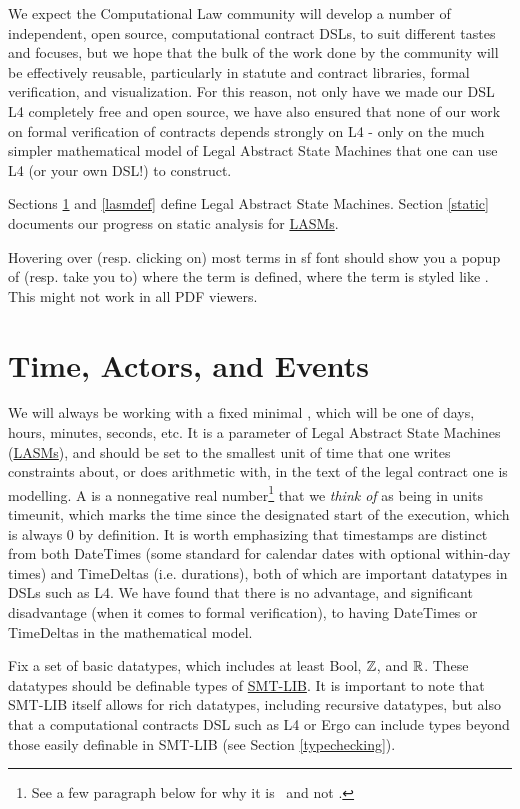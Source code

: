 \documentclass[12pt]{article}
\newcommand{\term}[1]{\EM{\textsf{\hyperref[#1]{#1}}}\xspace}
\newcommand{\lasm}{\term{LASM}}
\newcommand{\lasms}{{\sf \hyperref[LASM]{LASMs}}\xspace}
\newcommand{\DT}{\EM{\mathbb{\hyperref[DT]{D}}}}
\newcommand{\TS}{\EM{\mathbb{\hyperref[TS]{T}}}}
\begin{document}
We expect the Computational Law community will develop a number of independent, open source, computational contract DSLs, to suit different tastes and focuses, but we hope that the bulk of the work done by the community will be effectively reusable, particularly in statute and contract libraries, formal verification, and visualization. For this reason, not only have we made our DSL L4 completely free and open source, we have also ensured that none of our work on formal verification of contracts depends strongly on L4 - only on the much simpler mathematical model of Legal Abstract State Machines that one can use L4 (or your own DSL!) to construct.

Sections \ref{basics} and \ref{lasmdef} define Legal Abstract State Machines. Section \ref{static} documents our progress on static analysis for \lasms.

Hovering over (resp. clicking on) most terms in \textsf{{sf font}} should show you a popup of (resp. take you to)  where the term is defined, where the term is styled like . This might not work in all PDF viewers.


\section{Time, Actors, and Events} \label{basics}
We will always be working with a fixed minimal , which will be one of days, hours, minutes, seconds, etc. It is a parameter of Legal Abstract State Machines (\lasms), and should be set to the smallest unit of time that one writes constraints about, or does arithmetic with, in the text of the legal contract one is modelling.  A  is  a nonnegative real number\footnote{See a few paragraph below for why it is \RR\, and not \NN.} that we \textit{think of} as being in units timeunit, which marks the time since the designated start of the \lasm execution, which is always 0 by definition.
It is worth emphasizing that timestamps are distinct from both DateTimes (some standard for calendar dates with optional within-day times) and TimeDeltas (i.e. durations), both of which are important datatypes in DSLs such as L4. We have found that there is no advantage, and significant disadvantage (when it comes to formal verification), to having DateTimes or TimeDeltas in the mathematical model.

Fix a set \firstuse{$\DT$}{DT} of basic datatypes, which includes at least Bool, $\mathbb{Z}$, and $\mathbb{R}$. These datatypes should be definable types of \href{http://smtlib.cs.uiowa.edu/language.shtml}{SMT-LIB}. It is important to note that SMT-LIB itself allows for rich datatypes, including recursive datatypes, but also that a computational contracts DSL such as L4 or Ergo can include types beyond those easily definable in SMT-LIB (see Section \ref{typechecking}).
\end{document}
